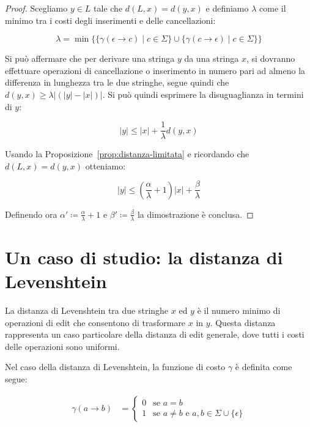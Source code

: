 \documentclass[a4paper,12pt]{report}
\theoremstyle{propositionstyle}
\begin{document}
    \begin{proof}
        Scegliamo $y \in L$ tale che $d\left(L, x\right) = d\left(y, x\right)$ e definiamo $\lambda$ come il minimo tra i costi degli inserimenti e delle cancellazioni:

        $$ \lambda = \min\bigl\{\{\gamma\left(\epsilon \rightarrow c\right) \mid c \in \Sigma\} \cup \{\gamma\left(c \rightarrow \epsilon\right) \mid c \in \Sigma\}\bigr\}$$

        Si può affermare che per derivare una stringa $y$ da una stringa $x$, si dovranno effettuare operazioni di cancellazione o inserimento in numero pari
        ad almeno la differenza in lunghezza tra le due stringhe, segue quindi che $d\left(y, x\right) \geq \lambda\bigl|\left(\lvert y \rvert - \lvert x \rvert\right)\bigr|$.
        Si può quindi esprimere la disuguaglianza in termini di $y$:

        $$\lvert y \rvert \leq \lvert x \rvert + \frac{1}{\lambda}d\left(y, x\right)$$

        Usando la Proposizione~\ref{prop:distanza-limitata} e ricordando che $d\left(L, x\right) = d\left(y, x\right)$ otteniamo:

        $$\lvert y \rvert \leq \left(\frac{\alpha}{\lambda} + 1\right)\lvert x \rvert + \frac{\beta}{\lambda}$$
        \vspace{0.5em}

        Definendo ora $\displaystyle \alpha' \coloneqq \frac{\alpha}{\lambda} + 1$ e $\displaystyle \beta' \coloneqq \frac{\beta}{\lambda}$ la dimostrazione è conclusa.
    \end{proof}
    
    \section{Un caso di studio: la distanza di Levenshtein}
    
    La distanza di Levenshtein tra due stringhe $x$ ed $y$ è il numero minimo di operazioni di edit che consentono di trasformare $x$ in $y$. Questa distanza rappresenta un caso particolare della distanza di edit generale, dove tutti i costi delle operazioni sono uniformi.
    
    Nel caso della distanza di Levenshtein, la funzione di costo $\gamma$ è definita come segue:

    \begin{align}
        \gamma(a \rightarrow b) &= \begin{cases}
            0 & \text{se } a = b \\
            1 & \text{se } a \neq b \text{ e } a, b \in \Sigma \cup \{\epsilon\}
        \end{cases}
    \end{align}
    
\end{document}
